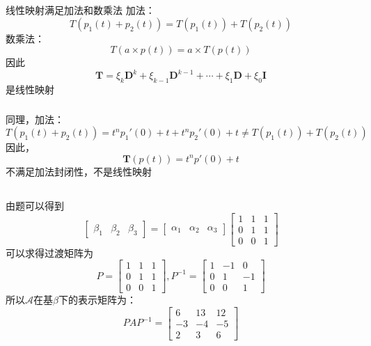 \documentclass[onecolumn,oneside]{SUSTechHomework}
\begin{document}
  \section{}
  \subsection{}
  \subsubsection{}
  线性映射满足加法和数乘法
  加法：
  \[
    T(p_1(t) + p_2(t)) = T(p_1(t)) + T(p_2(t))
  \]
  数乘法：
  \[
    T(a \times p(t)) = a \times T(p(t))
  \]
  因此
  \[
  \mathbf{T} = \xi_k \mathbf{D}^k + \xi_{k-1} \mathbf{D}^{k-1} + \cdots + \xi_1 \mathbf{D} + \xi_0 \mathbf{I}
  \]
  是线性映射
  \subsubsection{}
  同理，加法：
  \[
    T(p_1(t) + p_2(t)) = t^np_1'(0) + t + t^np_2'(0) + t \neq  T(p_1(t)) +  T(p_2(t))
  \]
  因此，
  \[
  \mathbf{T}(p(t)) = t^n p'(0) + t
  \]不满足加法封闭性，不是线性映射

  \subsection{}
  由题可以得到
  \[
  \begin{bmatrix}
    \beta_1 & \beta_2 & \beta_3
  \end{bmatrix}
    =
  \begin{bmatrix}
    \alpha_1 & \alpha_2 & \alpha_3
  \end{bmatrix}
  \begin{bmatrix}
    1 & 1 & 1 \\ 0 & 1 & 1 \\ 0 & 0 & 1
  \end{bmatrix}
  \]
  可以求得过渡矩阵为
  \[
    P = \begin{bmatrix}
      1 & 1 & 1 \\ 0 & 1 & 1 \\ 0 & 0 & 1
    \end{bmatrix}, 
    P^{-1} = \begin{bmatrix}
      1 & -1 & 0 \\ 0 & 1 & -1 \\ 0 & 0 & 1
    \end{bmatrix}
  \]
  所以\(\mathcal{A}\)在基\(\beta\)下的表示矩阵为：
  \[
    PAP^{-1} = \begin{bmatrix}
      6 & 13 & 12 \\ -3 & -4 & -5 \\ 2 & 3 & 6
    \end{bmatrix}
  \]
  
\end{document}
